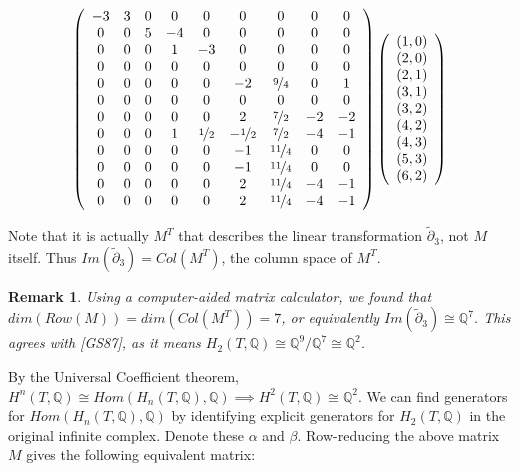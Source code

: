 \documentclass{amsart}
\newtheorem{Remark}[theorem]{Remark}
\newenvironment{remark}{\begin{Remark}\normalfont}{\end{Remark}}
\newcommand{\bq}{\ensuremath{\mathbb{Q}}} %
\begin{document}
$$
\left(
\begin{array}{*{9}c}
-3 & 3 & 0 & 0 & 0 & 0 & 0 & 0 & 0\\
0 & 0 & 5 & -4 & 0 & 0 & 0 & 0 & 0\\
0 & 0 & 0 & 1 & -3 & 0 & 0 & 0 & 0\\
0 & 0 & 0 & 0 & 0 & 0 & 0 & 0 & 0\\
0 & 0 & 0 & 0 & 0 & -2 & \nicefrac{9}{4} & 0 & 1\\
0 & 0 & 0 & 0 & 0 & 0 & 0 & 0 & 0\\
0 & 0 & 0 & 0 & 0 & 2 & \nicefrac{7}{2} & -2 & -2\\
0 & 0 & 0 & 1 & \nicefrac{1}{2} & -\nicefrac{1}{2} & \nicefrac{7}{2} & -4 & -1\\
0 & 0 & 0 & 0 & 0 & -1 & \nicefrac{11}{4} & 0 & 0\\
0 & 0 & 0 & 0 & 0 & -1 & \nicefrac{11}{4} & 0 & 0\\
0 & 0 & 0 & 0 & 0 & 2 & \nicefrac{11}{4} & -4 & -1\\
0 & 0 & 0 & 0 & 0 & 2 & \nicefrac{11}{4} & -4 & -1
\end{array}
\right)
\left(
\begin{array}{c}
	(1,0)\\
	(2,0)\\
	(2,1)\\
	(3,1)\\
	(3,2)\\
	(4,2)\\
	(4,3)\\
	(5,3)\\
	(6,2)
\end{array}
\right)
$$

\bigskip

Note that it is actually $M^{T}$ that describes the linear transformation $\widetilde{\partial}_{3}$, not $M$ itself. Thus $Im(\widetilde{\partial}_{3}) = Col(M^{T})$, the column space of $M^{T}$.

\begin{remark}
	Using a computer-aided matrix calculator, we found that $dim(Row(M)) = dim(Col(M^{T})) = 7$, or equivalently $Im(\widetilde{\partial}_{3}) \cong \bq^{7}$. This agrees with [GS87], as it means $H_{2}(T, \bq) \cong \bq^{9}/ \bq^{7} \cong \bq^{2}$. 
\end{remark}

By the Universal Coefficient theorem, $H^{n}(T, \bq) \cong Hom(H_{n}(T, \bq), \bq) \implies H^{2}(T, \bq) \cong \bq^{2}$. We can find generators for $Hom(H_{n}(T, \bq), \bq)$ by identifying explicit generators for $H_{2}(T, \bq)$ in the original infinite complex. Denote these $\alpha$ and $\beta$. Row-reducing the above matrix $M$ gives the following equivalent matrix:
\end{document}
